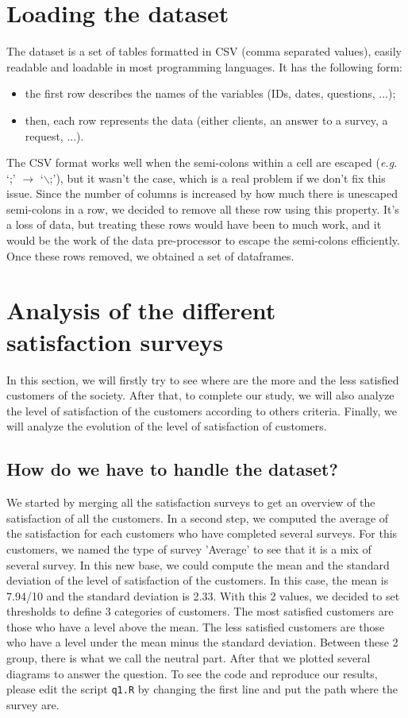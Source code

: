 \documentclass[a4paper, 11pt]{article}
\newcommand{\tw}[1]{\texttt{#1}}
\begin{document}
\section{Loading the dataset}
\label{sec:dataset_load}
	The dataset is a set of tables formatted in CSV (comma separated values), easily readable and loadable in most programming languages. It has the following form:
    \begin{itemize}[noitemsep]
    	\item the first row describes the names of the variables (IDs, dates, questions, ...);
        \item then, each row represents the data (either clients, an answer to a survey, a request, ...).
    \end{itemize}
    The CSV format works well when the semi-colons within a cell are escaped (\textit{e.g.} `;' $\rightarrow$ `$\backslash$;'), but it wasn't the case, which is a real problem if we don't fix this issue. Since the number of columns is increased by how much there is unescaped semi-colons in a row, we decided to remove all these row using this property. It's a loss of data, but treating these rows would have been to much work, and it would be the work of the data pre-processor to escape the semi-colons efficiently. \\
    Once these rows removed, we obtained a set of dataframes.

\section{Analysis of the different satisfaction surveys}
\label{sec:sat_survey_anal}
	In this section, we will firstly try to see where are the more and the less satisfied customers of the society. After that, to complete our study, we will also analyze the level of satisfaction of the customers according to others criteria. Finally, we will analyze the evolution of the level of satisfaction of customers.
    
    \subsection{How do we have to handle the dataset?}
    We started by merging all the satisfaction surveys to get an overview of the satisfaction of all the customers. In a second step, we computed the average of the satisfaction for each customers who have completed several surveys. For this customers, we named the type of survey 'Average' to see that it is a mix of several survey. In this new base, we could compute the mean and the standard deviation of the level of satisfaction of the customers. In this case, the mean is 7.94/10 and the standard deviation is 2.33. With this 2 values, we decided to set thresholds to define 3 categories of customers. The most satisfied customers are those who have a level above the mean. The less satisfied customers are those who have a level under the mean minus the standard deviation. Between these 2 group, there is what we call the neutral part. After that we plotted several diagrams to answer the question. To see the code and reproduce our results, please edit the script \tw{q1.R} by changing the first line and put the path where the survey are.
    
\end{document}
